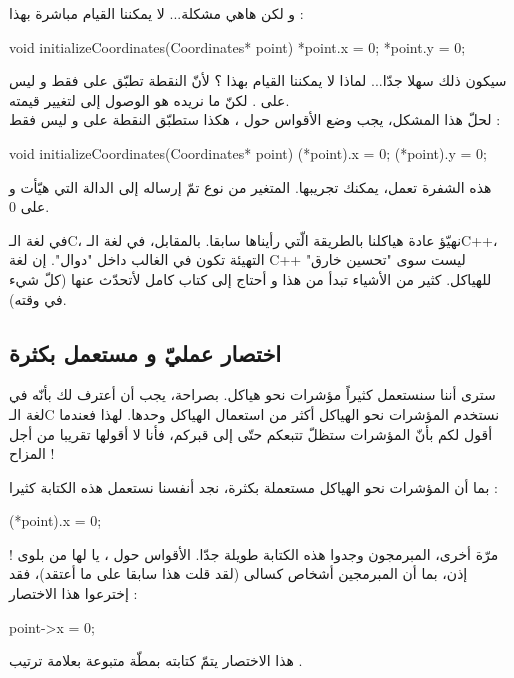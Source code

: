 و لكن هاهي مشكلة... لا يمكننا القيام مباشرة بهذا :
\begin{Csource}
void initializeCoordinates(Coordinates* point)
{
	*point.x = 0;
	*point.y = 0;
}
\end{Csource}
سيكون ذلك سهلا جدّا... لماذا لا يمكننا القيام بهذا ؟
لأنّ النقطة تطبّق على
فقط و ليس على
.
لكنّ ما نريده هو الوصول إلى
لتغيير قيمته.\\
لحلّ هذا المشكل، يجب وضع الأقواس حول
،
هكذا ستطبّق النقطة على
و ليس فقط
 :
\begin{Csource}
void initializeCoordinates(Coordinates* point)
{
	(*point).x = 0;
	(*point).y = 0;
}
\end{Csource}
هذه الشفرة تعمل، يمكنك تجريبها. المتغير من نوع
تمّ إرساله إلى الدالة التي هيّأت
و
على 0.
\begin{information}
في لغة الـ\textenglish{C}،
نهيّؤ عادة هياكلنا بالطريقة الّتي رأيناها سابقا. بالمقابل، في لغة الـ\textenglish{C++}،
التهيئة تكون في الغالب داخل "دوال".
إن لغة
\textenglish{C++}
ليست سوى "تحسين خارق" للهياكل. كثير من الأشياء تبدأ من هذا و أحتاج إلى كتاب كامل لأتحدّث عنها (كلّ شيء في وقته).
\end{information}

\subsection{اختصار عمليّ و مستعمل بكثرة}
سترى أننا سنستعمل كثيراً مؤشرات نحو هياكل. بصراحة، يجب أن أعترف لك بأنّه
في لغة الـ\textenglish{C}
نستخدم  المؤشرات نحو الهياكل أكثر من استعمال الهياكل وحدها. لهذا فعندما أقول لكم بأنّ المؤشرات ستظلّ تتبعكم حتّى إلى قبركم، فأنا لا أقولها تقريبا من أجل المزاح !

بما أن المؤشرات نحو الهياكل مستعملة بكثرة، نجد أنفسنا نستعمل هذه الكتابة كثيرا :
\begin{Csource}
(*point).x = 0;
\end{Csource}
مرّة أخرى، المبرمجون وجدوا هذه الكتابة طويلة جدّا. الأقواس حول
،
يا لها من بلوى ! إذن، بما أن المبرمجين أشخاص كسالى (لقد قلت هذا سابقا على ما أعتقد)، فقد إخترعوا هذا الاختصار :
\begin{Csource}
point->x = 0;
\end{Csource}
هذا الاختصار يتمّ كتابته بمطّة
\InlineCode{-}
متبوعة بعلامة ترتيب
\InlineCode{>}.


